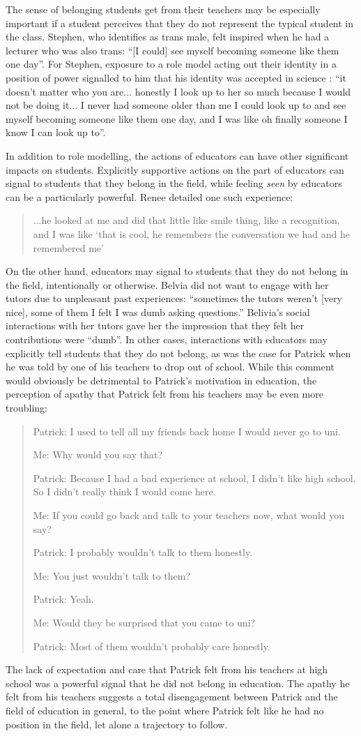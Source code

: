 The sense of belonging students get from their teachers may be especially important if a student perceives that they do not represent the typical student in the class. Stephen, who identifies as trans male, felt inspired when he had a lecturer who was also trans: ``[I could] see myself becoming someone like them one day''. For Stephen, exposure to a role model acting out their identity in a position of power signalled to him that his identity was accepted in science : ``it doesn't matter who you are... honestly I look up to her so much because I would not be doing it... I never had someone older than me I could look up to and see myself becoming someone like them one day, and I was like oh finally someone I know I can look up to''. 

In addition to role modelling, the actions of educators can have other significant impacts on students. Explicitly supportive actions on the part of educators can signal to students that they belong in the field, while feeling \textit{seen} by educators can be a particularly powerful. Renee detailed one such experience: \blockquote{...he looked at me and did that little like smile thing, like a recognition, and I was like `that is cool, he remembers the conversation we had and he remembered me'} On the other hand, educators may signal to students that they do not belong in the field, intentionally or otherwise. Belvia did not want to engage with her tutors due to unpleasant past experiences: ``sometimes the tutors weren't [very nice], some of them I felt I was dumb asking questions.'' Belivia's social interactions with her tutors gave her the impression that they felt her contributions were ``dumb''. In other cases, interactions with educators may explicitly tell students that they do not belong, as was the case for Patrick when he was told by one of his teachers to drop out of school. While this comment would obviously be detrimental to Patrick's motivation in education, the perception of apathy that Patrick felt from his teachers may be even more troubling: \blockquote{

Patrick: I used to tell all my friends back home I would never go to uni.

Me:	Why would you say that?

Patrick: Because I had a bad experience at school, I didn't like high school. So I didn't really think I would come here.

Me:	If you could go back and talk to your teachers now, what would you say?

Patrick: I probably wouldn't talk to them honestly.

Me:	You just wouldn't talk to them?

Patrick: Yeah.

Me: Would they be surprised that you came to uni?

Patrick: Most of them wouldn't probably care honestly.
}
The lack of expectation and care that Patrick felt from his teachers at high school was a powerful signal that he did not belong in education. The apathy he felt from his teachers suggests a total disengagement between Patrick and the field of education in general, to the point where Patrick felt like he had no position in the field, let alone a trajectory to follow. 

